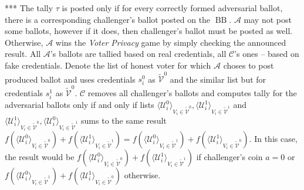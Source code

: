 \documentclass[12pt]{article}
\DeclareMathOperator{\bb}{BB}
\begin{document}
*** The tally $\tau$ is posted only if for every correctly formed adversarial ballot, there is a corresponding challenger's ballot posted on the $\bb$. $\mathcal{A}$ may not post some ballots, however if it does, then challenger's ballot must be posted as well. Otherwise, $\mathcal{A}$ wins the \textit{Voter Privacy} game by simply checking the announced result.  All $\mathcal{A}$'s ballots are tallied based on real credentials, all  $\mathcal{C}$'s ones -- based on fake credentials. Denote the list of honest voter for which $\mathcal{A}$ choses to post produced ballot and uses credentials $s_i^0$  as $ \tilde{\mathcal{V}}^0$ and the similar list but for credentials $s_i^1$ as $ \tilde{\mathcal{V}}^0$.   $\mathcal{C}$ removes all challenger's ballots and computes tally for the adversarial ballots only if and only if  lists $\langle \mathcal{U}^0_i \rangle _{V_i \in \tilde{\mathcal{V}}^0}, \langle \mathcal{U}^1_i \rangle _{V_i \in \tilde{\mathcal{V}}^1}$ and $\langle \mathcal{U}^1_i \rangle _{V_i \in \tilde{\mathcal{V}}^0}, \langle \mathcal{U}^0_i \rangle _{V_i \in \tilde{\mathcal{V}}^1}$ sums to the same result $f(\langle \mathcal{U}^0_i \rangle _{V_i \in \tilde{\mathcal{V}}^0} ) + f(\langle \mathcal{U}^1_i \rangle _{V_i \in \tilde{\mathcal{V}}^1} ) =  f(\langle \mathcal{U}^0_i \rangle _{V_i \in \tilde{\mathcal{V}}^1} ) +  f(\langle \mathcal{U}^1_i \rangle _{V_i \in \tilde{\mathcal{V}}^0} )$. In this case, the result would be $f(\langle \mathcal{U}^0_i \rangle _{V_i \in \tilde{\mathcal{V}}^0} ) + f(\langle \mathcal{U}^1_i \rangle _{V_i \in \tilde{\mathcal{V}}^1} )$ if challenger's coin $a=0$ or  $f(\langle \mathcal{U}^0_i \rangle _{V_i \in \tilde{\mathcal{V}}^1} ) +  f(\langle \mathcal{U}^1_i \rangle _{V_i \in \tilde{\mathcal{V}}^0} )$ otherwise.\\
\end{document}
